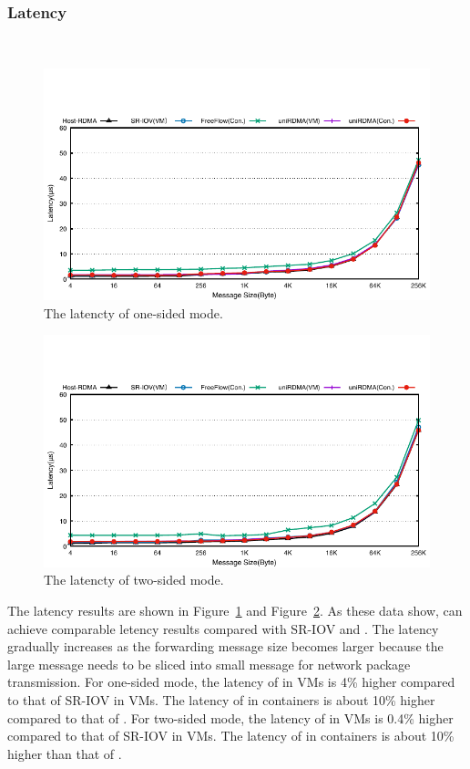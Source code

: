 \subsubsection{\textbf{Latency}}
\
\noindent

\begin{figure}[!ht]
	\centering
	\includegraphics[width=1.00\linewidth]{images/write-lat.pdf}
	\caption{The latencty of one-sided mode.}
	\label{fig:write-lat}
\end{figure}


\begin{figure}[!ht]
	\centering
	\includegraphics[width=1.00\linewidth]{images/send-lat.pdf}
	\caption{The latencty of two-sided mode.}
	\label{fig:send-lat}
\end{figure}


The latency results are shown in Figure~\ref{fig:write-lat} and Figure~\ref{fig:send-lat}. As these data show, \sys can achieve comparable letency results compared with SR-IOV and \native. The latency gradually increases as the forwarding message size becomes larger because the large message needs to be sliced into small message for network package transmission.
For one-sided mode, the latency of \sys in VMs is 4\% higher compared to that of SR-IOV in VMs. The latency of \sys in containers is about 10\% higher compared to that of \native. For two-sided mode, the latency of \sys in VMs is 0.4\% higher compared to that of SR-IOV in VMs. The latency of \sys in containers is about 10\% higher than that of \native.

